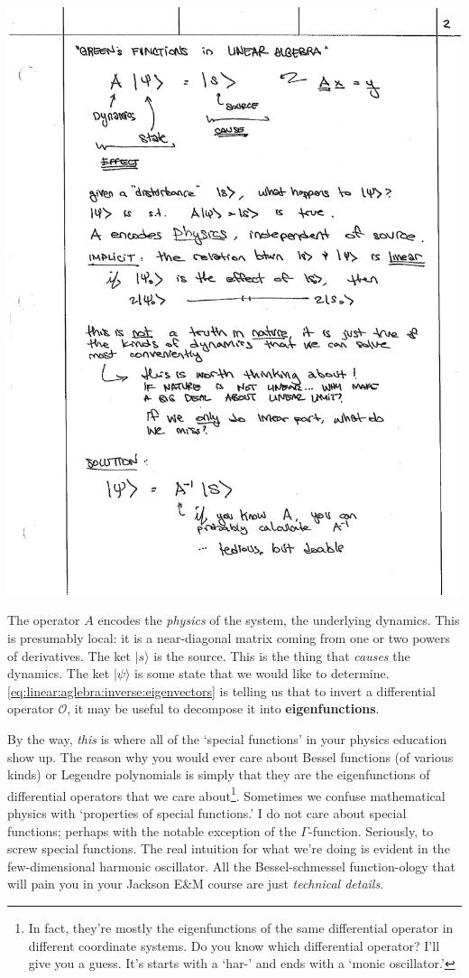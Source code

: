 \begin{center}
\includegraphics[width=.7\textwidth]{figures/lec02_green01.pdf}
\end{center}

 The operator $A$ encodes the \emph{physics} of the system, the underlying dynamics. This is presumably local: it is a near-diagonal matrix coming from one or two powers of derivatives.  The ket $|s\rangle$ is the source. This is the thing that \emph{causes} the dynamics. The ket $|\psi\rangle$ is some state that we would like to determine. \eqref{eq:linear:aglebra:inverse:eigenvectors} is telling us that to invert a differential operator $\mathcal O$, it may be useful to decompose it into \textbf{eigenfunctions}.

 By the way, \emph{this} is where all of the `special functions' in your physics education show up. The reason why you would ever care about Bessel functions (of various kinds) or Legendre polynomials is simply that they are the eigenfunctions of differential operators that we care about\footnote{In fact, they're mostly the eigenfunctions of the same differential operator in different coordinate systems. Do you know which differential operator? I'll give you a guess. It's starts with a `har-' and ends with a `monic oscillator.'}. Sometimes we confuse mathematical physics with `properties of special functions.' I do not care about special functions; perhaps with the notable exception of the $\Gamma$-function. Seriously, to screw special functions. The real intuition for what we're doing is evident in the few-dimensional harmonic oscillator. All the Bessel-schmessel function-ology that will pain you in your Jackson E\&M course are just \emph{technical details}.

